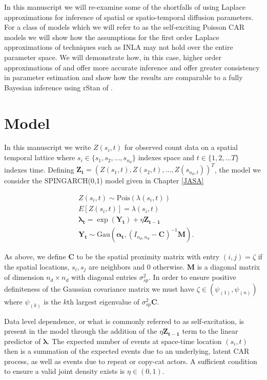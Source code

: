\documentclass[11pt]{isuthesis}
\begin{document}
	In this manuscript we will re-examine some of the shortfalls of using Laplace approximations for inference of spatial or spatio-temporal diffusion parameters.  For a class of models which we will refer to as the self-exciting Poisson CAR models we will show how the assumptions for the first order Laplace approximations of techniques such as INLA may not hold over the entire parameter space.  We will demonstrate how, in this case, higher order approximations of \cite{shun1995laplace} and \cite{evangelou2011estimation} offer more accurate inference and offer greater consistency in parameter estimation and show how the results are comparable to a fully Bayesian inference using rStan of \cite{gelman2015stan}.
	
	
	\section{Model}
	
	
	
	
	
	In this manuscript we write $Z(s_i,t)$ for observed count data on a spatial temporal lattice where $s_i \in \{s_1,s_2,...,s_{n_d}\}$ indexes space and $t\in\{1,2,...T\}$ indexes time.  Defining $\boldsymbol{Z_t} = (Z(s_1,t),Z(s_2,t),...,Z(s_{n_d,t}))^T$, the model we consider the SPINGARCH(0,1) model given in Chapter \ref{JASA}
	
	\begin{align}
	& Z(s_i,t) \sim \mbox{Pois}(\lambda(s_i,t)) \label{eq:timeseries2} \\
	& E[Z(s_i,t)]=\lambda(s_i,t)\\
	& \boldsymbol{\lambda_t} = \exp(\boldsymbol{Y_t})+\eta \boldsymbol{Z_{t-1}}\\
	& \boldsymbol{Y_t} \sim \mbox{Gau}\textit{} (\boldsymbol{\alpha_t},(I_{{n_d},{n_d}}-\boldsymbol{C})^{-1}\boldsymbol{M}).
	\end{align}
	
	As above, we define $\boldsymbol{C}$ to be the spatial proximity matrix with entry $(i,j)=\zeta$ if the spatial locations, $s_i,s_j$ are neighbors and $0$ otherwise.  $\boldsymbol{M}$ is a diagonal matrix of dimension $n_d \times n_d$ with diagonal entries $\sigma_{sp}^2$.  In order to ensure positive definiteness of the Gaussian covariance matrix we must have $\zeta \in (\psi_{(1)},\psi_{(n)})$ where $\psi_{(k)}$ is the $k$th largest eigenvalue of $\sigma_{sp}^2\boldsymbol{C}$.   
	
	Data level dependence, or what is commonly referred to as self-excitation, is present in the model through the addition of the $\eta \boldsymbol{Z_{t-1}}$ term to the linear predictor of $\boldsymbol{\lambda}$.  The expected number of events at space-time location $(s_i,t)$ then is a summation of the expected events due to an underlying, latent CAR process, as well as events due to repeat or copy-cat actors.  A sufficient condition to ensure a valid joint density exists is $\eta \in (0,1)$.  
	
\end{document}
